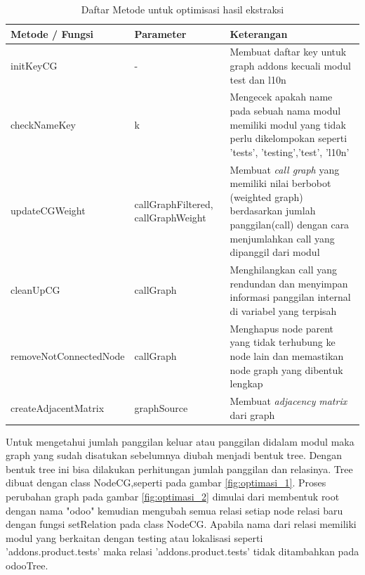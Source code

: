 \begingroup
\setlength{\LTleft}{-20cm plus -1fill}
\setlength{\LTright}{\LTleft}
\begin{small}
	\begin{longtable}{|p{4cm}|p{3cm}|p{6cm}|}
		\caption{Daftar Metode untuk optimisasi hasil ekstraksi}\\
		\hline
		\textbf{Metode / Fungsi} & \textbf{Parameter} & \textbf{Keterangan}\\
		\endfirsthead
		
		 \hline
		 initKeyCG
			& -
		 & Membuat daftar key untuk graph addons kecuali modul test dan l10n  \\
		 
		 \hline
		 checkNameKey		 
			& k
		 & Mengecek apakah name pada sebuah nama modul memiliki modul yang tidak perlu dikelompokan seperti 'tests', 'testing','test', 'l10n' \\

		 \hline
		 updateCGWeight
		& callGraphFiltered, callGraphWeight
		 & Membuat \textit{call graph} yang memiliki nilai berbobot (weighted graph) berdasarkan jumlah panggilan(call) dengan cara menjumlahkan call yang dipanggil dari modul \\

		 
		 \hline 
		 cleanUpCG
			& callGraph
		 & Menghilangkan call yang rendundan dan  menyimpan informasi panggilan internal di variabel yang terpisah\\

		 \hline
		 removeNotConnectedNode
		& callGraph
		 & Menghapus node parent yang tidak terhubung ke node lain  dan memastikan node graph yang dibentuk lengkap\\
		

		 \hline  
		createAdjacentMatrix
		& graphSource
		 & Membuat \textit{adjacency} \textit{matrix} dari graph  \\
		
		 \hline  
		 
	\end{longtable}
\end{small}
\endgroup

Untuk mengetahui jumlah panggilan keluar atau panggilan didalam modul maka graph yang sudah disatukan sebelumnya diubah menjadi bentuk tree. Dengan bentuk tree ini bisa dilakukan perhitungan jumlah panggilan dan relasinya. Tree dibuat dengan class NodeCG,seperti pada gambar \ref{fig:optimasi_1}. Proses perubahan graph pada gambar \ref{fig:optimasi_2} dimulai dari membentuk root dengan nama "odoo" kemudian mengubah semua relasi setiap node relasi baru dengan fungsi setRelation pada class NodeCG. Apabila nama dari relasi memiliki modul yang berkaitan dengan testing atau lokalisasi seperti 'addons.product.tests' maka relasi 'addons.product.tests' tidak  ditambahkan pada odooTree. 

